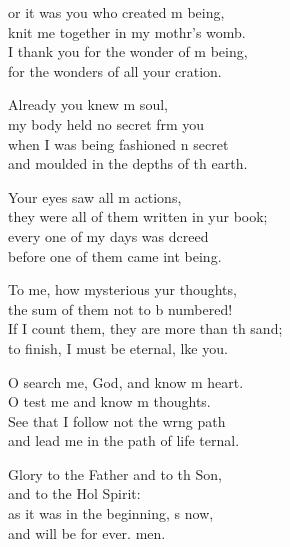 \settowidth{\versewidth}{If I count them, they are more than the sand; *}
\begin{psalmverse}%
  \begin{patverse}
or it was you who created m being,\Med\\
knit me together in my mothr’s womb.\\
I thank you for the wonder of m being,\Med\\
for the wonders of all your cration.

Already you knew m soul,\Med\\
my body held no secret frm you\\
when I was being fashioned \pointup{\i}n secret\Med\\
and moulded in the depths of th earth.

Your eyes saw all m actions,\Med\\
they were all of them written in yur book;\\
every one of my days was dcreed\Med\\
before one of them came int being.

To me, how mysterious yur thoughts,\Med\\
the sum of them not to b numbered!\\
If I count them, they are more than th sand;\Med\\
to finish, I must be eternal, l\pointup{\i}ke you.

O search me, God, and know m heart.\Med\\
O test me and know m thoughts.\\
See that I follow not the wrng path\Med\\
and lead me in the path of life ternal.

Glory to the Father and to th Son,\Med\\
and to the Hol Spirit:\\
as it was in the beginning, \pointup{\i}s now,\Med\\
and will be for ever. men.
  \end{patverse}
\end{psalmverse}
